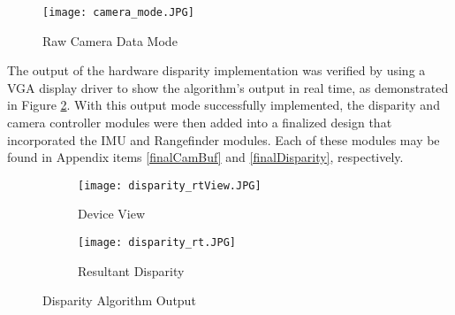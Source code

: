 \par
\begin{figure}[H]
	\centerline{
	\texttt{[image: camera\_mode.JPG]}
	}
	\caption{Raw Camera Data Mode}
	\label{camOutMode}
\end{figure}
\par
The output of the hardware disparity implementation was verified by using a VGA display driver to show the algorithm's output in real time, as demonstrated in Figure \ref{disparityFin}. With this output mode successfully implemented, the disparity and camera controller modules were then added into a finalized design that incorporated the IMU and Rangefinder modules. Each of these modules may be found in Appendix items \ref{finalCamBuf} and \ref{finalDisparity}, respectively. 
\par
\begin{figure}[H] 
	\begin{subfigure}{0.5\textwidth}
	\centering
		\texttt{[image: disparity\_rtView.JPG]}
		\caption{Device View}
	\end{subfigure}
	\begin{subfigure}{0.5\textwidth}
	\centering
		\texttt{[image: disparity\_rt.JPG]}
		\caption{Resultant Disparity}
	\end{subfigure}
	\caption{Disparity Algorithm Output}
	\label{disparityFin}
\end{figure}